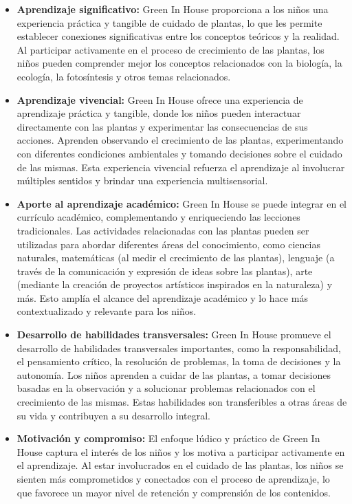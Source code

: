 \begin{itemize}
    
    \item \textbf{Aprendizaje significativo:} Green In House proporciona a los niños una experiencia práctica y tangible de cuidado de plantas, lo que les permite establecer conexiones significativas entre los conceptos teóricos y la realidad. Al participar activamente en el proceso de crecimiento de las plantas, los niños pueden comprender mejor los conceptos relacionados con la biología, la ecología, la fotosíntesis y otros temas relacionados.
    
    \item \textbf{Aprendizaje vivencial:} Green In House ofrece una experiencia de aprendizaje práctica y tangible, donde los niños pueden interactuar directamente con las plantas y experimentar las consecuencias de sus acciones. Aprenden observando el crecimiento de las plantas, experimentando con diferentes condiciones ambientales y tomando decisiones sobre el cuidado de las mismas. Esta experiencia vivencial refuerza el aprendizaje al involucrar múltiples sentidos y brindar una experiencia multisensorial.
    
    \item \textbf{Aporte al aprendizaje académico:} Green In House se puede integrar en el currículo académico, complementando y enriqueciendo las lecciones tradicionales. Las actividades relacionadas con las plantas pueden ser utilizadas para abordar diferentes áreas del conocimiento, como ciencias naturales, matemáticas (al medir el crecimiento de las plantas), lenguaje (a través de la comunicación y expresión de ideas sobre las plantas), arte (mediante la creación de proyectos artísticos inspirados en la naturaleza) y más. Esto amplía el alcance del aprendizaje académico y lo hace más contextualizado y relevante para los niños.
    
    \item \textbf{Desarrollo de habilidades transversales:} Green In House promueve el desarrollo de habilidades transversales importantes, como la responsabilidad, el pensamiento crítico, la resolución de problemas, la toma de decisiones y la autonomía. Los niños aprenden a cuidar de las plantas, a tomar decisiones basadas en la observación y a solucionar problemas relacionados con el crecimiento de las mismas. Estas habilidades son transferibles a otras áreas de su vida y contribuyen a su desarrollo integral.
    
    \item \textbf{Motivación y compromiso:} El enfoque lúdico y práctico de Green In House captura el interés de los niños y los motiva a participar activamente en el aprendizaje. Al estar involucrados en el cuidado de las plantas, los niños se sienten más comprometidos y conectados con el proceso de aprendizaje, lo que favorece un mayor nivel de retención y comprensión de los contenidos.
    
\end{itemize}

